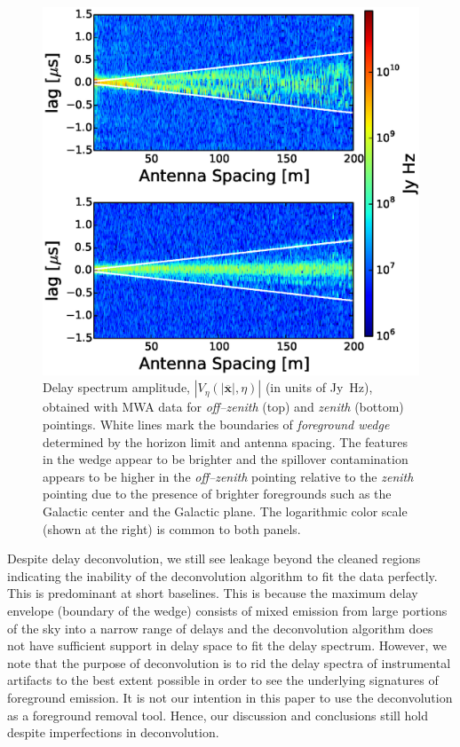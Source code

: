 \documentclass[preprint2,iop,numberedappendix]{emulateapj}
\begin{document}
\begin{figure}[htb]
\centering
\includegraphics[width=\linewidth]{figures/v1_0/multi_baseline_fhd_delay_spectrum_snapshots.eps}
\caption{Delay spectrum amplitude, $|V_\eta(|\overline{\mathbf{x}}|,\eta)|$ (in units of Jy~Hz), obtained with MWA data for {\it off--zenith} (top) and {\it zenith} (bottom) pointings. White lines mark the boundaries of {\it foreground wedge} determined by the horizon limit and antenna spacing. The features in the wedge appear to be brighter and the spillover contamination appears to be higher in the {\it off--zenith} pointing relative to the {\it zenith} pointing due to the presence of brighter foregrounds such as the Galactic center and the Galactic plane. The logarithmic color scale (shown at the right) is common to both panels.\label{fig:fhd_data}}
\end{figure}

Despite delay deconvolution, we still see leakage beyond the cleaned regions indicating the inability of the deconvolution algorithm to fit the data perfectly. This is predominant at short baselines. This is because the maximum delay envelope (boundary of the wedge) consists of mixed emission from large portions of the sky into a narrow range of delays and the deconvolution algorithm does not have sufficient support in delay space to fit the delay spectrum. However, we note that the purpose of deconvolution is to rid the delay spectra of instrumental artifacts to the best extent possible in order to see the underlying signatures of foreground emission. It is not our intention in this paper to use the deconvolution as a foreground removal tool. Hence, our discussion and conclusions still hold despite imperfections in deconvolution.
\end{document}
